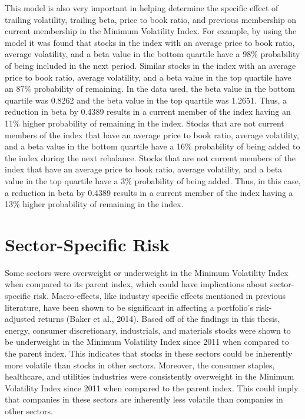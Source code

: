 \documentclass[12pt,twoside]{reedthesis}
\theoremstyle{definition}
\theoremstyle{definition}
\theoremstyle{definition}
\theoremstyle{remark}
\begin{document}
This model is also very important in helping determine the specific
effect of trailing volatility, trailing beta, price to book ratio, and
previous membership on current membership in the Minimum Volatility
Index. For example, by using the model it was found that stocks in the
index with an average price to book ratio, average volatility, and a
beta value in the bottom quartile have a 98\% probability of being
included in the next period. Similar stocks in the index with an average
price to book ratio, average volatility, and a beta value in the top
quartile have an 87\% probability of remaining. In the data used, the
beta value in the bottom quartile was 0.8262 and the beta value in the
top quartile was 1.2651. Thus, a reduction in beta by 0.4389 results in
a current member of the index having an 11\% higher probability of
remaining in the index. Stocks that are not current members of the index
that have an average price to book ratio, average volatility, and a beta
value in the bottom quartile have a 16\% probability of being added to
the index during the next rebalance. Stocks that are not current members
of the index that have an average price to book ratio, average
volatility, and a beta value in the top quartile have a 3\% probability
of being added. Thus, in this case, a reduction in beta by 0.4389
results in a current member of the index having a 13\% higher
probability of remaining in the index.

\section{Sector-Specific Risk}\label{sector-specific-risk}

Some sectors were overweight or underweight in the Minimum Volatility
Index when compared to its parent index, which could have implications
about sector-specific risk. Macro-effects, like industry specific
effects mentioned in previous literature, have been shown to be
significant in affecting a portfolio's risk-adjusted returns (Baker et
al., 2014). Based off of the findings in this thesis, energy, consumer
discretionary, industrials, and materials stocks were shown to be
underweight in the Minimum Volatility Index since 2011 when compared to
the parent index. This indicates that stocks in these sectors could be
inherently more volatile than stocks in other sectors. Moreover, the
consumer staples, healthcare, and utilities industries were consistently
overweight in the Minimum Volatility Index since 2011 when compared to
the parent index. This could imply that companies in these sectors are
inherently less volatile than companies in other sectors.
\end{document}
